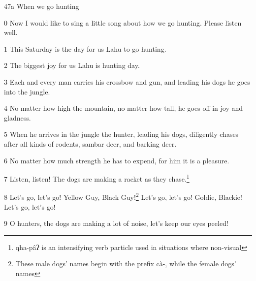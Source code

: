 
47a When we go hunting

0 Now I would like to sing a little song about how we go hunting. Please listen
well.

1 This Saturday is the day for us Lahu to go hunting.

2 The biggest joy for us Lahu is hunting day.

3 Each and every man carries his crossbow and gun, and leading his dogs he goes
into the jungle.

4 No matter how high the mountain, no matter how tall, he goes off in joy and gladness.

5 When he arrives in the jungle the hunter, leading his dogs, diligently chases
after all kinds of rodents, sambar deer, and barking deer.

6 No matter how much strength he has to expend, for him it is a pleasure.

7 Listen, listen! The dogs are making a racket as they chase.\footnote{qha-pâʔ is an intensifying verb particle used in situations where non-visual}

8 Let's go, let's go! Yellow Guy, Black Guy!\footnote{These male dogs' names begin with the prefix cà-, while the female dogs' names} Let's go, let's go! Goldie, Blackie!
Let's go, let's go!

9 O hunters, the dogs are making a lot of noise, let's keep our eyes peeled!

